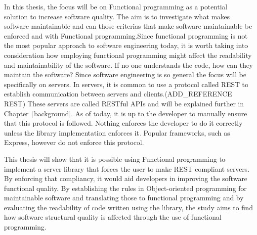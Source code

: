 In this thesis, the focus will be on Functional programming as a potential
solution to increase software quality. The aim is to investigate what makes
software maintainable and can those criterias that make software maintainable be
enforced and with Functional programming.Since functional programming is not the
most popular approach to software engineering today, it is worth taking into
consideration how employing functional programming might affect the readability
and maintainability of the software. If no one understands the code, how can
they maintain the software?  Since software engineering is so general the focus
will be specifically on servers. In servers, it is common to use a protocol
called REST to establish communication between servers and
clients.(ADD\_REFERENCE REST)  These servers are called RESTful APIs and will be
explained further in Chapter~\ref{background}.  As of today, it is up to the
developer to manually ensure that this protocol is followed. Nothing enforces
the developer to do it correctly unless the library implementation enforces it.
Popular frameworks, such as Express, however do not enforce this protocol.

This thesis will show that it is possible using Functional programming to
implement a server library that forces the user to make REST compliant servers.
By enforcing that compliancy, it would aid developers in improving the software
functional quality. By establishing the rules in Object-oriented programming
for maintainable software and translating those to functional programming and by
evaluating the readability of code written using the library, the study aims to
find how software structural quality is affected through the use of functional
programming.
